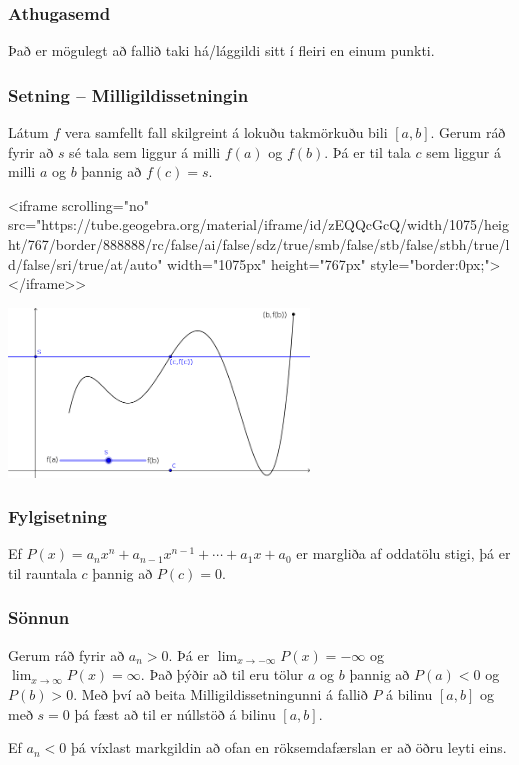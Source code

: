 \documentclass[icelandic,a4paper,12pt]{article}
\begin{document}
\subsubsection{Athugasemd}
Það er mögulegt að fallið taki há/lággildi sitt í fleiri en einum punkti.

\subsubsection{Setning -- Milligildissetningin}
Látum $f$ vera samfellt fall skilgreint á lokuðu takmörkuðu bili
$[a,b]$.  Gerum ráð fyrir að $s$ sé tala sem liggur á milli $f(a)$ og
$f(b)$.  Þá er til tala $c$ sem liggur á milli $a$ og $b$ þannig að
$f(c)=s$. 
 
<iframe scrolling="no" src="https://tube.geogebra.org/material/iframe/id/zEQQcGcQ/width/1075/height/767/border/888888/rc/false/ai/false/sdz/true/smb/false/stb/false/stbh/true/ld/false/sri/true/at/auto" width="1075px" height="767px" style="border:0px;"> </iframe>>
\begin{center}
 \includegraphics[width=8cm,keepaspectratio=true]{./myndir/kafli02/10_Milligildissetn.png}
\end{center}

\subsubsection{Fylgisetning}
Ef $P(x)=a_nx^n+a_{n-1}x^{n-1}+\cdots+a_1x+a_0$ er margliða af
oddatölu stigi, þá er til rauntala $c$ þannig að $P(c)=0$.

\subsubsection{Sönnun}
Gerum ráð fyrir að $a_n>0$.
Þá er $\lim_{x\to -\infty} P(x) = -\infty$ og
$\lim_{x\to \infty} P(x) = \infty$.
Það þýðir að til eru tölur $a$ og $b$ 
þannig að $P(a)<0$ og $P(b)>0$.
Með því að beita Milligildissetningunni á fallið $P$ á 
bilinu $[a,b]$ og með $s=0$ þá fæst að til er núllstöð 
á bilinu $[a,b]$.
	
Ef $a_n < 0$ þá víxlast markgildin að ofan en röksemdafærslan er
að öðru leyti eins.
\end{document}
